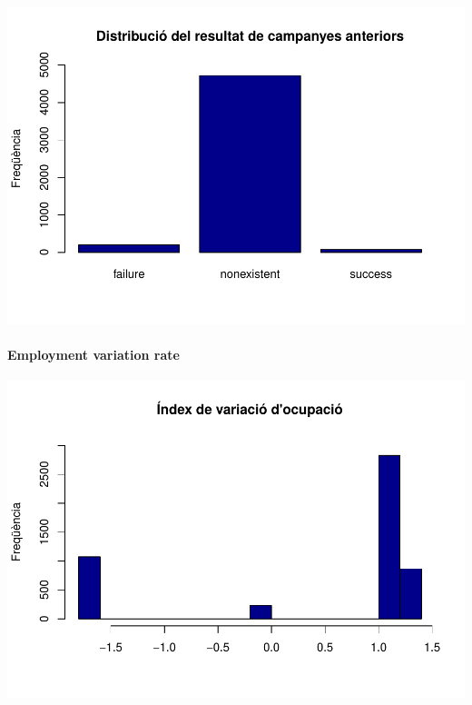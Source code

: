\documentclass[
]{article}
\newenvironment{Shaded}{\begin{snugshade}}{\end{snugshade}}
\newcommand{\AttributeTok}[1]{\textcolor[rgb]{0.77,0.63,0.00}{#1}}
\newcommand{\DecValTok}[1]{\textcolor[rgb]{0.00,0.00,0.81}{#1}}
\newcommand{\FunctionTok}[1]{\textcolor[rgb]{0.00,0.00,0.00}{#1}}
\newcommand{\NormalTok}[1]{#1}
\newcommand{\SpecialCharTok}[1]{\textcolor[rgb]{0.00,0.00,0.00}{#1}}
\newcommand{\StringTok}[1]{\textcolor[rgb]{0.31,0.60,0.02}{#1}}
\begin{document}
\includegraphics{Entrega-1_files/figure-latex/unnamed-chunk-24-1.pdf}

\hypertarget{employment-variation-rate}{%
\paragraph{Employment variation rate}\label{employment-variation-rate}}

\begin{Shaded}
\end{Shaded}

\includegraphics{Entrega-1_files/figure-latex/unnamed-chunk-25-1.pdf}
\end{document}
